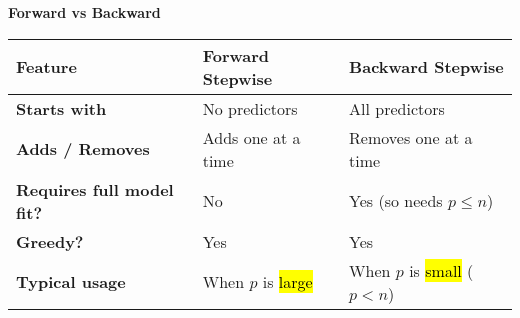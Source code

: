 \begin{flushleft}
    \textcolor{Green3}{ \textbf{Forward vs Backward}}
\end{flushleft}
\begin{table}[!htp]
    \centering
    \begin{tabular}{@{} l l l @{}}
        \toprule
        Feature                             & Forward Stepwise      & Backward Stepwise \\
        \midrule
        \textbf{Starts with}                & No predictors         & All predictors                    \\ [.3em]
        \textbf{Adds / Removes}             & Adds one at a time    & Removes one at a time             \\ [.3em]
        \textbf{Requires full model fit?}   & No                    & Yes (so needs $p \le n$)          \\ [.3em]
        \textbf{Greedy?}                    & Yes                   & Yes                               \\ [.3em]
        \textbf{Typical usage}              & When $p$ is \hl{large}& When $p$ is \hl{small} ($p < n$)  \\
        \bottomrule
    \end{tabular}
\end{table}